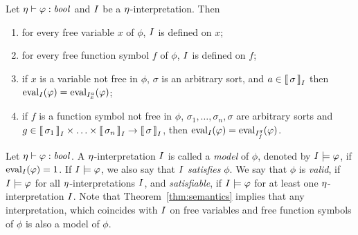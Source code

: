 \begin{theorem}\label{thm:semantics}
  Let $\eta \vdash \varphi : \mathit{bool}$ and $I$ be a $\eta$-interpretation. Then
  \begin{enumerate}
    \item for every free variable $x$ of $\phi$, $I$ is defined on $x$;
    \item for every free function symbol $f$ of $\phi$, $I$ is defined on $f$;
    \item if $x$ is a variable not free in $\phi$, $\sigma$ is an arbitrary sort, and $a \in \left\llbracket\,{\sigma}\,\right\rrbracket_{I}$ then $\mathrm{eval}_{I}({\varphi}) = \mathrm{eval}_{{I}_{x}^{a}}({\varphi})$;
    \item if $f$ is a function symbol not free in $\phi$, $\sigma_1,\ldots,\sigma_n,\sigma$ are arbitrary sorts and $g \in \left\llbracket\,{\sigma_1}\,\right\rrbracket_{I} \times \ldots \times \left\llbracket\,{\sigma_n}\,\right\rrbracket_{I} \to \left\llbracket\,{\sigma}\,\right\rrbracket_{I}$, then $\mathrm{eval}_{I}({\varphi}) = \mathrm{eval}_{{I}_{f}^{g}}({\varphi})$. \QED
  \end{enumerate}
\end{theorem}

Let $\eta \vdash \varphi : \mathit{bool}$. A $\eta$-interpretation $I$ is called a \emph{model} of $\phi$, denoted by $I \models \varphi$, if $\mathrm{eval}_{I}({\varphi}) = 1$. If $I \models \varphi$, we also say that $I$ \emph{satisfies} $\phi$. We say that $\phi$ is \emph{valid}, if $I \models \varphi$ for all $\eta$-interpretations $I$, and \emph{satisfiable}, if $I \models \varphi$ for at least one $\eta$-interpretation $I$. Note that Theorem~\ref{thm:semantics} implies that any interpretation, which coincides with $I$ on free variables and free function symbols of $\phi$ is also a model of $\phi$.
